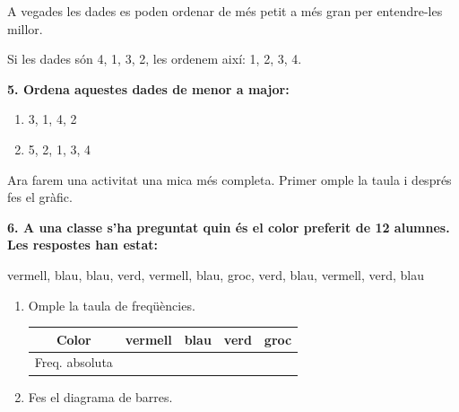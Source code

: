 \documentclass[12pt,a4paper]{article}
\begin{document}
\begin{capsula}
A vegades les dades es poden ordenar de més petit a més gran per entendre-les millor.
\end{capsula}

\begin{exemple}
Si les dades són 4, 1, 3, 2, les ordenem així: 1, 2, 3, 4.
\end{exemple}

\textbf{5. Ordena aquestes dades de menor a major:}

\begin{enumerate}[label=\alph*)]
    \item 3, 1, 4, 2 \vspace{0.7cm}
    \item 5, 2, 1, 3, 4 \vspace{0.7cm}
\end{enumerate}

\begin{capsula}
Ara farem una activitat una mica més completa. Primer omple la taula i després fes el gràfic.
\end{capsula}

\textbf{6. A una classe s'ha preguntat quin és el color preferit de 12 alumnes. Les respostes han estat:}

\begin{center}
vermell, blau, blau, verd, vermell, blau, groc, verd, blau, vermell, verd, blau
\end{center}

\begin{enumerate}[label=\alph*)]
    \item Omple la taula de freqüències. \vspace{0.3cm}

    \begin{center}
    \begin{tabular}{|c|c|c|c|c|}
    \hline
    \rowcolor{cyan!20}
    Color & vermell & blau & verd & groc \\ \hline
    Freq. absoluta &  &  &  &  \\ \hline
    \end{tabular}
    \end{center}

    \item Fes el diagrama de barres. \vspace{0.3cm}
\end{enumerate}

\begin{center}
\end{center}
\end{document}

